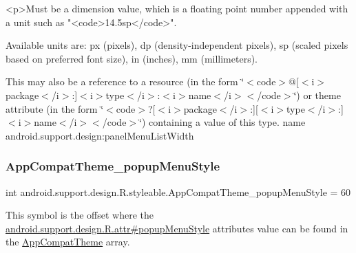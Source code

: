 \begin{DoxyVerb}      <p>Must be a dimension value, which is a floating point number appended with a unit such as "<code>14.5sp</code>".
\end{DoxyVerb}
 Available units are\+: px (pixels), dp (density-\/independent pixels), sp (scaled pixels based on preferred font size), in (inches), mm (millimeters). 

This may also be a reference to a resource (in the form \char`\"{}$<$code$>$@\mbox{[}$<$i$>$package$<$/i$>$\+:\mbox{]}$<$i$>$type$<$/i$>$\+:$<$i$>$name$<$/i$>$$<$/code$>$\char`\"{}) or theme attribute (in the form \char`\"{}$<$code$>$?\mbox{[}$<$i$>$package$<$/i$>$\+:\mbox{]}\mbox{[}$<$i$>$type$<$/i$>$\+:\mbox{]}$<$i$>$name$<$/i$>$$<$/code$>$\char`\"{}) containing a value of this type.  name android.\+support.\+design\+:panel\+Menu\+List\+Width \mbox{\label{classandroid_1_1support_1_1design_1_1R_1_1styleable_a98dfd09dfbb476ddbf9036698ee8bf9c}} 
\subsubsection{\texorpdfstring{App\+Compat\+Theme\+\_\+popup\+Menu\+Style}{AppCompatTheme\_popupMenuStyle}}
{\footnotesize\ttfamily int android.\+support.\+design.\+R.\+styleable.\+App\+Compat\+Theme\+\_\+popup\+Menu\+Style = 60\hspace{0.3cm}{\ttfamily [static]}}

This symbol is the offset where the \hyperlink{classandroid_1_1support_1_1design_1_1R_1_1attr_a390433602092ab37564f0a189f9099a0}{android.\+support.\+design.\+R.\+attr\#popup\+Menu\+Style} attribute\textquotesingle{}s value can be found in the \hyperlink{classandroid_1_1support_1_1design_1_1R_1_1styleable_afb351dc8de20cbd4c89abe360373010c}{App\+Compat\+Theme} array.

